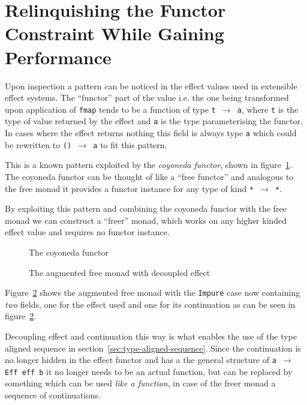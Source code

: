 \section{Relinquishing the Functor Constraint While Gaining Performance}

\label{sec:freer}

Upon inspection a pattern can be noticed in the effect values used in extensible
effect systems. The ``functor'' part of the value i.e. the one being transformed
upon application of \texttt{fmap} tends to be a function of type \texttt{t
  $\rightarrow$ a}, where \texttt{t} is the type of value returned by the effect
and \texttt{a} is the type parameterising the functor. In cases where the effect
returns nothing this field is always type \texttt{a} which could be rewritten to
\texttt{() $\rightarrow$ a} to fit this pattern.

This is a known pattern exploited by the \emph{coyoneda functor}, shown in
figure~\ref{fig:coyoneda}. The coyoneda functor can be thought of like a ``free
functor'' and analogous to the free monad it provides a functor instance for
any type of kind \texttt{* $\rightarrow$ *}.

By exploiting this pattern and combining the coyoneda functor with the free
monad we can construct a ``freer'' monad, which works on any higher kinded
effect value and requires no functor instance.

\begin{figure}
  
  \caption{The coyoneda functor}
  \label{fig:coyoneda}
\end{figure}

\begin{figure}
  
  \caption{The augmented free monad with decoupled effect}
  \label{fig:freer-monad}
\end{figure}

Figure~\ref{fig:freer-monad} shows the augmented free monad with the
\texttt{Impure} case now containing \emph{two} fields, one for the effect used
and one for its continuation as can be seen in figure~\ref{fig:freer-monad}.

Decoupling effect and continuation this way is what enables the use of the type
aligned sequence in section~\ref{sec:type-aligned-sequence}. Since the
continuation is no longer hidden in the effect functor and has a the general
structure of \texttt{a $\rightarrow$ Eff eff b} it no longer needs to be an
actual function, but can be replaced by something which can be used \emph{like a
  function}, in case of the freer monad a sequence of continuations.

